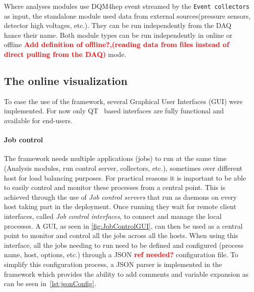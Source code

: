 \documentclass{webofc}
\begin{document}
Where analyses modules use DQM4hep event streamed by the \texttt{Event collectors} as input, the standalone module 
used data from external sources(pressure sensors, detector high voltages, etc.). They can be run independently from the DAQ hance their name. 
Both module types can be run independently in online or offline \textcolor{red}{\textbf{Add definition of offline?,(reading data from files instead of direct pulling from the DAQ)}} mode.


\subsection{The online visualization}
\label{subsec:vis}

To ease the use of the framework, several Graphical User Interfaces (GUI) were implemented. For now only QT~\cite{QT} based interfaces are fully functional and available for end-users. 

\paragraph{Job control}\label{par:JobControl}

The framework needs multiple applications (jobs) to run at the same time (Analysis modules, run control server, collectors, etc.), sometimes over different host for load balancing purposes. For practical reasons it is important to be able to easily control and monitor these processes from a central point. This is achieved through the use of \textit{Job control servers} that run as daemons on every host taking part in the deployment. Once running they wait for remote client interfaces, called \textit{Job control interfaces}, to connect and manage the local processes. A GUI, as seen in \autoref{fig:JobControlGUI}, can then be used as a central point to monitor and control all the jobs across all the hosts. When using this interface, all the jobs needing to run need to be defined and configured (process name, host, options, etc.) through a JSON \textcolor{red}{\textbf{ref needed?}} configuration file. To simplify this configuration process, a JSON parser is implemented in the framework which provides the ability to add comments and variable expansion as can be seen in~\autoref{lst:jsonConfig}.
\end{document}
